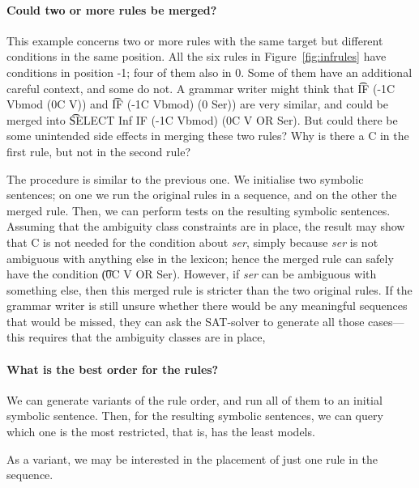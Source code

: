 \paragraph{Could two or more rules be merged?} This example concerns two or more rules with the same target but different conditions in the same position. 
All the six rules in Figure~\ref{fig:infrules} have conditions in position -1; four of them also in 0. Some of them have an additional careful context, and some do not.
A grammar writer might think that \t{IF (-1C Vbmod (0C V))} and \t{IF (-1C Vbmod) (0 Ser))} are very similar, and could be merged into \t{SELECT Inf IF (-1C Vbmod) (0C V OR Ser)}. But could there be some unintended side effects in merging these two rules? Why is there a C in the first rule, but not in the second rule? 

The procedure is similar to the previous one. We initialise two symbolic sentences; on one we run the original rules in a sequence, and on the other the merged rule. 
Then, we can perform tests on the resulting symbolic sentences. Assuming that the ambiguity class constraints are in place, the result may show that C is not needed for the condition about {\em ser}, simply because {\em ser} is not ambiguous with anything else in the lexicon; hence the merged rule can safely have the condition \t{(0C V OR Ser)}. However, if {\em ser} can be ambiguous with something else, then this merged rule is stricter than the two original rules. If the grammar writer is still unsure whether there would be any meaningful sequences that would be missed, they can ask the SAT-solver to generate all those cases---this requires that the ambiguity classes are in place,  


\paragraph{What is the best order for the rules?}
We can generate variants of the rule order, and run all of them to an initial symbolic sentence. Then, for the resulting symbolic sentences, we can query which one is the most restricted, that is, has the least models.

As a variant, we may be interested in the placement of just one rule in the sequence.

